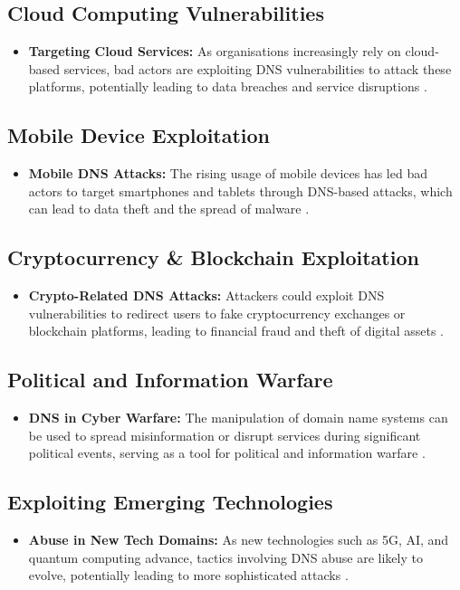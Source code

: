 \subsection{Cloud Computing Vulnerabilities}
\begin{itemize}
    \item \textbf{Targeting Cloud Services:} As organisations increasingly rely on cloud-based services, bad actors are exploiting DNS vulnerabilities to attack these platforms, potentially leading to data breaches and service disruptions \cite{mather2009cloud}.
\end{itemize}

\subsection{Mobile Device Exploitation}
\begin{itemize}
    \item \textbf{Mobile DNS Attacks:} The rising usage of mobile devices has led bad actors to target smartphones and tablets through DNS-based attacks, which can lead to data theft and the spread of malware \cite{au2016mobile}.
\end{itemize}

\subsection{Cryptocurrency \& Blockchain Exploitation}
\begin{itemize}
    \item \textbf{Crypto-Related DNS Attacks:} Attackers could exploit DNS vulnerabilities to redirect users to fake cryptocurrency exchanges or blockchain platforms, leading to financial fraud and theft of digital assets \cite{bashir2019advanced}.
\end{itemize}

\subsection{Political and Information Warfare}
\begin{itemize}
    \item \textbf{DNS in Cyber Warfare:} The manipulation of domain name systems can be used to spread misinformation or disrupt services during significant political events, serving as a tool for political and information warfare \cite{chapple2021cyberwarfare}.
\end{itemize}

\subsection{Exploiting Emerging Technologies}
\begin{itemize}
    \item \textbf{Abuse in New Tech Domains:} As new technologies such as 5G, AI, and quantum computing advance, tactics involving DNS abuse are likely to evolve, potentially leading to more sophisticated attacks \cite{brunner2021cybersecurity}.
\end{itemize}

